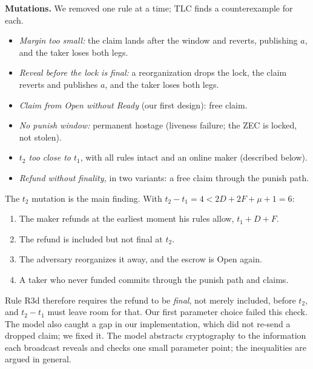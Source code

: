 \documentclass[10pt,letterpaper]{article}
\theoremstyle{plain}
\theoremstyle{definition}
\newcommand{\st}[1]{\textsf{#1}}
\begin{document}
\textbf{Mutations.} We removed one rule at a time; TLC finds a counterexample for each.
\begin{itemize}\setlength\itemsep{0.05em}
\item \emph{Margin too small:} the claim lands after the window and reverts, publishing $a$, and the
taker loses both legs.
\item \emph{Reveal before the lock is final:} a reorganization drops the lock, the claim reverts and
publishes $a$, and the taker loses both legs.
\item \emph{Claim from \st{Open} without Ready} (our first design): free claim.
\item \emph{No punish window:} permanent hostage (liveness failure; the ZEC is locked, not stolen).
\item \emph{$t_2$ too close to $t_1$}, with all rules intact and an online maker (described below).
\item \emph{Refund without finality,} in two variants: a free claim through the punish path.
\end{itemize}

The $t_2$ mutation is the main finding. With $t_2 - t_1 = 4 < 2D+2F+\mu+1 = 6$:
\begin{enumerate}\setlength\itemsep{0.05em}
\item The maker refunds at the earliest moment his rules allow, $t_1 + D + F$.
\item The refund is included but not final at $t_2$.
\item The adversary reorganizes it away, and the escrow is \st{Open} again.
\item A taker who never funded commits through the punish path and claims.
\end{enumerate}
Rule R3d therefore requires the refund to be \emph{final}, not merely included, before $t_2$, and
$t_2 - t_1$ must leave room for that. Our first parameter choice failed this check. The model
also caught a gap in our implementation, which did not re-send a dropped claim; we fixed it. The
model abstracts cryptography to the information each broadcast reveals and checks one small
parameter point; the inequalities are argued in general.
\end{document}
